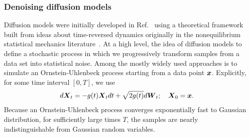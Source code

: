\documentclass[11pt]{article}
\begin{document}
\subsubsection{Denoising diffusion models}

Diffusion models were initially developed in Ref.~\cite{sohl-dickstein_hamiltonian_2012} using a theoretical framework built from ideas about time-reversed dynamics originally in the nonequilibrium statistical mechanics literature~\cite{crooks_entropy_1999, kurchan_fluctuation_1998, lebowitz_gallavotticohen-type_1999}. 
At a high level, the idea of diffusion models to define a stochastic process in which we progressively transform samples from a data set into statistical noise.
Among the mostly widely used approaches is to simulate an Ornstein-Uhlenbeck process starting from a data point $\boldsymbol{x}$.
Explicitly, for some time interval $[0, T]$, we use
\begin{equation}
    d\boldsymbol{X}_t = - g(t) \boldsymbol{X}_t dt + \sqrt{2 g(t)} d\boldsymbol{W}_t; \quad \boldsymbol{X}_0 = \boldsymbol{x}.
    \label{eq:ou}
\end{equation}
Because an Ornstein-Uhlenbeck process converges exponentially fast to Gaussian distribution, for sufficiently large times $T$, the samples are nearly indistinguishable from Gaussian random variables. 
\end{document}
